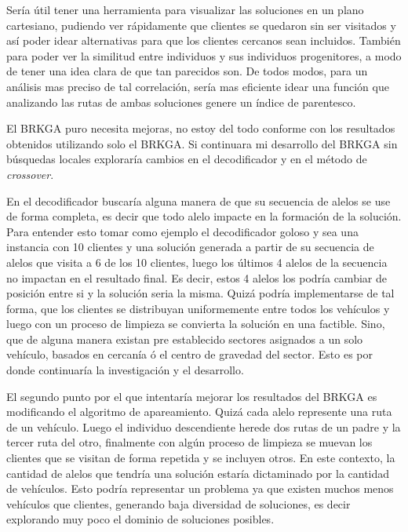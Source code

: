 Sería útil tener una herramienta para visualizar las soluciones en un plano cartesiano, pudiendo ver rápidamente que clientes se quedaron sin ser visitados y así poder idear alternativas para que los clientes cercanos sean incluidos. También para poder ver la similitud entre individuos y sus individuos progenitores, a modo de tener una idea clara de que tan parecidos son. De todos modos, para un análisis mas preciso de tal correlación, sería mas eficiente idear una función que analizando las rutas de ambas soluciones genere un índice de parentesco.

\bigskip

El BRKGA puro necesita mejoras, no estoy del todo conforme con los resultados obtenidos utilizando solo el BRKGA. Si continuara mi desarrollo del BRKGA sin búsquedas locales exploraría cambios en el decodificador y en el método de \textit{crossover}. 

\bigskip

En el decodificador buscaría alguna manera de que su secuencia de alelos se use de forma completa, es decir que todo alelo impacte en la formación de la solución. Para entender esto tomar como ejemplo el decodificador goloso y sea una instancia con 10 clientes y una solución generada a partir de su secuencia de alelos que visita a 6 de los 10 clientes, luego los últimos 4 alelos de la secuencia no impactan en el resultado final. Es decir, estos 4 alelos los podría cambiar de posición entre si y la solución seria la misma. Quizá podría implementarse de tal forma, que los clientes se distribuyan uniformemente entre todos los vehículos y luego con un proceso de limpieza se convierta la solución en una factible. Sino, que de alguna manera existan pre establecido sectores asignados a un solo vehículo, basados en cercanía ó el centro de gravedad del sector. Esto es por donde continuaría la investigación y el desarrollo.

\bigskip

El segundo punto por el que intentaría mejorar los resultados del BRKGA es modificando el algoritmo de apareamiento. Quizá cada alelo represente una ruta de un vehículo. Luego el individuo descendiente herede dos rutas de un padre y la tercer ruta del otro, finalmente con algún proceso de limpieza se muevan los clientes que se visitan de forma repetida y se incluyen otros. En este contexto, la cantidad de alelos que tendría una solución estaría dictaminado por la cantidad de vehículos. Esto podría representar un problema ya que existen muchos menos vehículos que clientes, generando baja diversidad de soluciones, es decir explorando muy poco el dominio de soluciones posibles.

